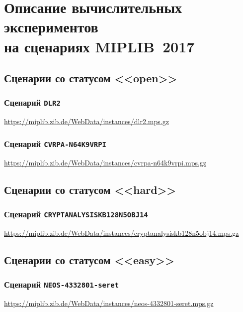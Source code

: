 \documentclass[%
	11pt,
	a4paper,
	utf8,
		]{article}
\begin{document}
{\section{Описание вычислительных экспериментов \\на сценариях MIPLIB~2017}

\subsection{Сценарии со статусом <<open>>}

\subsubsection{Сценарий \texttt{DLR2}}

\url{https://miplib.zib.de/WebData/instances/dlr2.mps.gz}

\subsubsection{Сценарий \texttt{CVRPA-N64K9VRPI}}

\url{https://miplib.zib.de/WebData/instances/cvrpa-n64k9vrpi.mps.gz}

\subsection{Сценарии со статусом <<hard>>}

\subsubsection{Сценарий \texttt{CRYPTANALYSISKB128N5OBJ14}}

\url{https://miplib.zib.de/WebData/instances/cryptanalysiskb128n5obj14.mps.gz}

\subsection{Сценарии со статусом <<easy>>}

\subsubsection{Сценарий \texttt{NEOS-4332801-seret}}

\url{https://miplib.zib.de/WebData/instances/neos-4332801-seret.mps.gz}


\newpage
\listoffigures{}

}
\end{document}
